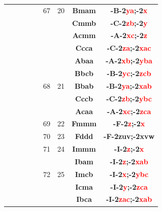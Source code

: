 \documentclass{article}      %
\begin{document}
\begin{small}
\begin{longtable}[c]{|c|c|c|c|c|c|c|c|c|}
	  &  & & & &\textrm{67}  &\textrm{20} &\textbf{Bmam}         &\textbf{-B-2\textcolor{red}{ya};-2\textcolor{red}{x}}\\\cline{8-9}        
          &  & & & &  & &\textbf{Cmmb}         &\textbf{-C-2\textcolor{red}{zb};-2\textcolor{red}{y}}\\\cline{8-9}        
          &  & & & &  & &\textbf{Acmm}         &\textbf{-A-2\textcolor{red}{xc};-2\textcolor{red}{z}}\\\cline{6-9}        
          &  & & & &  & &\textbf{Ccca}         &\textbf{-C-2\textcolor{red}{za};-2\textcolor{red}{xac}}\\\cline{8-9}      
          &  & & & &  & &\textbf{Abaa}         &\textbf{-A-2\textcolor{red}{xb};-2\textcolor{red}{yba}}\\\cline{8-9}      
          &  & & & &  & &\textbf{Bbcb}         &\textbf{-B-2\textcolor{red}{yc};-2\textcolor{red}{zcb}}\\\cline{8-9}      
	  &  & & & &\textrm{68}  &\textrm{21} &\textbf{Bbab}         &\textbf{-B-2\textcolor{red}{ya};-2\textcolor{red}{xab}}\\\cline{8-9}      
          &  & & & &  & &\textbf{Cccb}         &\textbf{-C-2\textcolor{red}{zb};-2\textcolor{red}{ybc}}\\\cline{8-9}      
          &  & & & &  & &\textbf{Acaa}         &\textbf{-A-2\textcolor{red}{xc};-2\textcolor{red}{zca}}\\\cline{6-9}      
	  &  & & & &\textrm{69}  &\textrm{22} &\textbf{Fmmm}         &\textbf{-F-2\textcolor{red}{z};-2\textcolor{red}{x}}\\\cline{6-9}         
	  &  & & & &\textrm{70}  &\textrm{23} &\textbf{Fddd}         &\textbf{-F-2zuv;-2xvw}\\\cline{6-9}     
	  &  & & & &\textrm{71}  &\textrm{24} &\textbf{Immm}         &\textbf{-I-2\textcolor{red}{z};-2\textcolor{red}{x}}\\\cline{6-9}         
          &  & & & &  & &\textbf{Ibam}         &\textbf{-I-2\textcolor{red}{z};-2\textcolor{red}{xab}}\\\cline{8-9}       
	  &  & & & &\textrm{72}  &\textrm{25} &\textbf{Imcb}         &\textbf{-I-2\textcolor{red}{x};-2\textcolor{red}{ybc}}\\\cline{8-9}       
          &  & & & &  & &\textbf{Icma}         &\textbf{-I-2\textcolor{red}{y};-2\textcolor{red}{zca}}\\\cline{6-9}       
          &  & & & &  & &\textbf{Ibca}         &\textbf{-I-2\textcolor{red}{zac};-2\textcolor{red}{xab}}\\\cline{8-9}     

\end{longtable}
\end{small}
\end{document}
